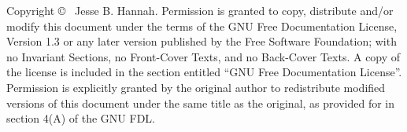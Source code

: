 \vspace*{\fill}
\begin{center}
Copyright \copyright{} \the\year~Jesse B. Hannah.
\break\break
Permission is granted to copy, distribute and/or modify this document under the
terms of the GNU Free Documentation License, Version 1.3 or any later version
published by the Free Software Foundation; with no Invariant Sections, no
Front-Cover Texts, and no Back-Cover Texts. A copy of the license is included
in the section entitled ``GNU Free Documentation License''. Permission is
explicitly granted by the original author to redistribute modified versions of
this document under the same title as the original, as provided for in section
4(A) of the GNU FDL.
\end{center}
\vspace*{\fill}
